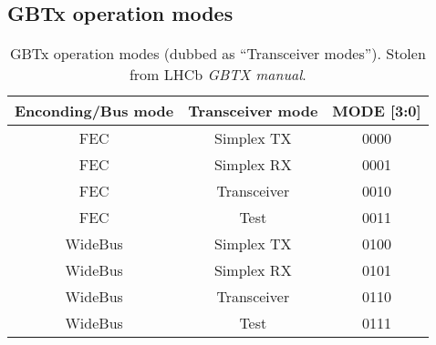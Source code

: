 \subsection{GBTx operation modes} \label{appx:4bit}
\begin{table}[ht]
    \begin{tabular}{ccc}
        \toprule
        Enconding/Bus mode & Transceiver mode & MODE [3:0] \\
        \midrule
        FEC & Simplex TX  & 0000 \\
        FEC & Simplex RX  & 0001 \\
        FEC & Transceiver & 0010 \\
        FEC & Test        & 0011 \\
        WideBus & Simplex TX  & 0100 \\
        WideBus & Simplex RX  & 0101 \\
        WideBus & Transceiver & 0110 \\
        WideBus & Test        & 0111 \\
        \bottomrule
    \end{tabular}
    \caption{
        GBTx operation modes (dubbed as ``Transceiver modes'').
        Stolen from LHCb \emph{GBTX manual}.
    }
    \label{tab:gbtx-modes}
\end{table}
